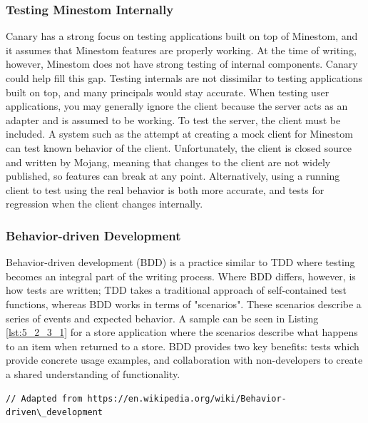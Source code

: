 \documentclass[12pt]{article}
\begin{document}
\begin{onehalfspacing}
\subsubsection{Testing Minestom Internally}

Canary has a strong focus on testing applications built on top of
Minestom, and it assumes that Minestom features are properly working. At
the time of writing, however, Minestom does not have strong testing of
internal components. Canary could help fill this gap. Testing internals
are not dissimilar to testing applications built on top, and many
principals would stay accurate. When testing user applications, you may
generally ignore the client because the server acts as an adapter and is
assumed to be working. To test the server, the client must be included.
A system such as the attempt at creating a mock client for Minestom can
test known behavior of the client. Unfortunately, the client is closed
source and written by Mojang, meaning that changes to the client are not
widely published, so features can break at any point. Alternatively,
using a running client to test using the real behavior is both more
accurate, and tests for regression when the client changes internally.

\subsubsection{Behavior-driven Development}

Behavior-driven development (BDD) is a practice similar to TDD where
testing becomes an integral part of the writing process. Where BDD
differs, however, is how tests are written; TDD takes a traditional
approach of self-contained test functions, whereas BDD works in terms of
"scenarios". These scenarios describe a series of events and expected
behavior. A sample can be seen in Listing \ref{lst:5_2_3_1} for a store
application where the scenarios describe what happens to an item when
returned to a store. BDD provides two key benefits: tests which provide
concrete usage examples, and collaboration with non-developers to create
a shared understanding of functionality.



\begin{listing}[H]
\begin{verbatim}
// Adapted from https://en.wikipedia.org/wiki/Behavior-driven\_development


\end{verbatim}
\end{listing}
\end{onehalfspacing}
\end{document}
